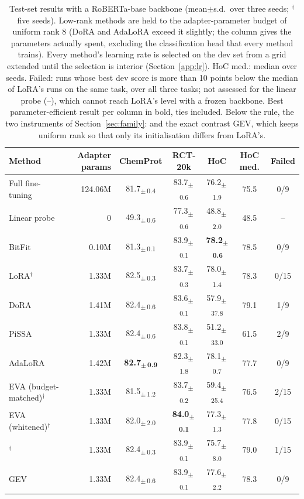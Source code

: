 \begin{table}[t]
\centering
\caption{Test-set results with a RoBERTa-base backbone (mean$\pm$s.d.\ over three seeds; $^\dagger$five seeds). Low-rank methods are held to the adapter-parameter budget of uniform rank 8 (DoRA and AdaLoRA exceed it slightly; the column gives the parameters actually spent, excluding the classification head that every method trains). Every method's learning rate is selected on the dev set from a grid extended until the selection is interior (Section~\ref{app:lr}). HoC med.: median over seeds. Failed: runs whose best dev score is more than 10 points below the median of LoRA's runs on the same task, over all three tasks; not assessed for the linear probe (--), which cannot reach LoRA's level with a frozen backbone. Best parameter-efficient result per column in bold, ties included. Below the rule, the two instruments of Section~\ref{sec:family}: \method{} and the exact contrast GEV, which keeps uniform rank so that only its initialisation differs from LoRA's.}
\label{tab:main}
\begin{tabular}{l r c c c c c}
\toprule
Method & Adapter params & ChemProt & RCT-20k & HoC & HoC med. & Failed \\
\midrule
Full fine-tuning & 124.06M & 81.7\textsubscript{$\pm$\,0.4} & 83.7\textsubscript{$\pm$\,0.6} & 76.2\textsubscript{$\pm$\,1.9} & 75.5 & 0/9 \\
Linear probe & 0 & 49.3\textsubscript{$\pm$\,0.6} & 77.3\textsubscript{$\pm$\,0.6} & 48.8\textsubscript{$\pm$\,2.0} & 48.5 & -- \\
BitFit & 0.10M & 81.3\textsubscript{$\pm$\,0.1} & 83.9\textsubscript{$\pm$\,0.1} & \textbf{78.2\textsubscript{$\pm$\,0.6}} & 78.5 & 0/9 \\
LoRA$^\dagger$ & 1.33M & 82.5\textsubscript{$\pm$\,0.3} & 83.7\textsubscript{$\pm$\,0.3} & 78.0\textsubscript{$\pm$\,1.4} & 78.3 & 0/15 \\
DoRA & 1.41M & 82.4\textsubscript{$\pm$\,0.6} & 83.6\textsubscript{$\pm$\,0.1} & 57.9\textsubscript{$\pm$\,37.8} & 79.1 & 1/9 \\
PiSSA & 1.33M & 82.4\textsubscript{$\pm$\,0.6} & 83.8\textsubscript{$\pm$\,0.1} & 51.2\textsubscript{$\pm$\,33.0} & 61.5 & 2/9 \\
AdaLoRA & 1.42M & \textbf{82.7\textsubscript{$\pm$\,0.9}} & 82.3\textsubscript{$\pm$\,1.8} & 78.1\textsubscript{$\pm$\,0.7} & 77.7 & 0/9 \\
EVA (budget-matched)$^\dagger$ & 1.33M & 81.5\textsubscript{$\pm$\,1.2} & 83.7\textsubscript{$\pm$\,0.2} & 59.4\textsubscript{$\pm$\,25.4} & 76.5 & 2/15 \\
EVA (whitened)$^\dagger$ & 1.33M & 82.0\textsubscript{$\pm$\,2.0} & \textbf{84.0\textsubscript{$\pm$\,0.1}} & 77.3\textsubscript{$\pm$\,1.3} & 77.8 & 0/15 \\
\midrule
\method{}$^\dagger$ & 1.33M & 82.4\textsubscript{$\pm$\,0.3} & 83.9\textsubscript{$\pm$\,0.1} & 75.7\textsubscript{$\pm$\,8.0} & 79.0 & 1/15 \\
GEV & 1.33M & 82.4\textsubscript{$\pm$\,0.6} & 83.9\textsubscript{$\pm$\,0.1} & 77.6\textsubscript{$\pm$\,2.2} & 78.3 & 0/9 \\
\bottomrule
\end{tabular}
\end{table}

